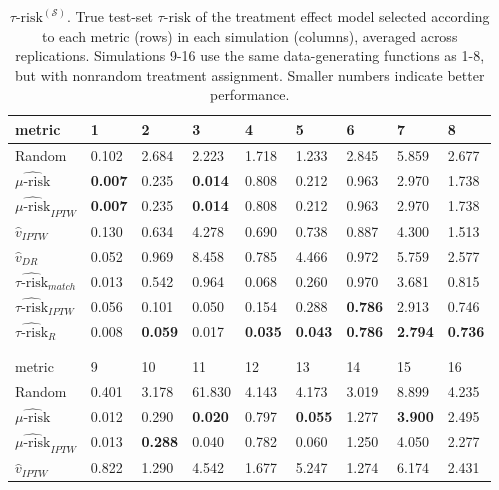 \begin{table}[ht]
\centering
\caption{$\tau\text{-risk}^{(\mathcal{S})}$. True test-set $\tau\text{-risk}$ of the treatment effect model selected according to each metric (rows) in each simulation (columns), averaged across replications. Simulations 9-16 use the same data-generating functions as 1-8, but with nonrandom treatment assignment. Smaller numbers indicate better performance.}
\begin{tabular}{lllllllll}
  \hline
metric & 1 & 2 & 3 & 4 & 5 & 6 & 7 & 8 \\ 
  \hline
Random & 0.102 & 2.684 & 2.223 & 1.718 & 1.233 & 2.845 & 5.859 & 2.677 \\ 
  $\widehat{\mu\text{-risk}}$ & \bfseries{0.007} & 0.235 & \bfseries{0.014} & 0.808 & 0.212 & 0.963 & 2.970 & 1.738 \\ 
  $\widehat{\mu\text{-risk}}_{IPTW}$ & \bfseries{0.007} & 0.235 & \bfseries{0.014} & 0.808 & 0.212 & 0.963 & 2.970 & 1.738 \\ 
  $\hat v_{IPTW}$ & 0.130 & 0.634 & 4.278 & 0.690 & 0.738 & 0.887 & 4.300 & 1.513 \\ 
  $\hat v_{DR}$ & 0.052 & 0.969 & 8.458 & 0.785 & 4.466 & 0.972 & 5.759 & 2.577 \\ 
  $\widehat{\tau\text{-risk}}_{match}$ & 0.013 & 0.542 & 0.964 & 0.068 & 0.260 & 0.970 & 3.681 & 0.815 \\ 
  $\widehat{\tau\text{-risk}}_{IPTW}$ & 0.056 & 0.101 & 0.050 & 0.154 & 0.288 & \bfseries{0.786} & 2.913 & 0.746 \\ 
  $\widehat{\tau\text{-risk}}_{R}$ & 0.008 & \bfseries{0.059} & 0.017 & \bfseries{0.035} & \bfseries{0.043} & \bfseries{0.786} & \bfseries{2.794} & \bfseries{0.736} \\ 
  \hline
   \\
  \\
  \hline
metric & 9 & 10 & 11 & 12 & 13 & 14 & 15 & 16 \\ 
  \hline
Random & 0.401 & 3.178 & 61.830 & 4.143 & 4.173 & 3.019 & 8.899 & 4.235 \\ 
  $\widehat{\mu\text{-risk}}$ & 0.012 & 0.290 & \bfseries{0.020} & 0.797 & \bfseries{0.055} & 1.277 & \bfseries{3.900} & 2.495 \\ 
  $\widehat{\mu\text{-risk}}_{IPTW}$ & 0.013 & \bfseries{0.288} & 0.040 & 0.782 & 0.060 & 1.250 & 4.050 & 2.277 \\ 
  $\hat v_{IPTW}$ & 0.822 & 1.290 & 4.542 & 1.677 & 5.247 & 1.274 & 6.174 & 2.431 \\ 

\end{tabular}
\end{table}
